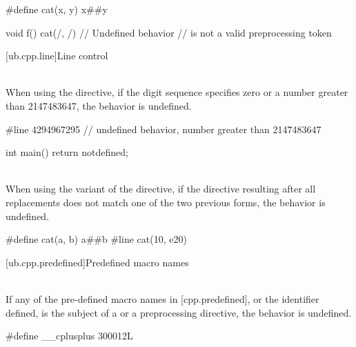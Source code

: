 \pnum
\begin{example}
\begin{codeblock}
#define cat(x, y) x##y

void f() {
  cat(/, /) // Undefined behavior // is not a valid preprocessing token
}
\end{codeblock}
\end{example}


[ub.cpp.line]{Line control}

\pnum
{} \\
When using the  directive, if the digit sequence
specifies zero or a number greater than 2147483647, the behavior is undefined.

\pnum
\begin{example}
\begin{codeblock}
#line 4294967295        // undefined behavior, number greater than 2147483647

int main() { return notdefined; }
\end{codeblock}
\end{example}

\pnum
{} \\
When using the  variant of the  directive, if the directive resulting after all replacements does not match
one of the two previous forms, the behavior is undefined.

\pnum
\begin{example}
\begin{codeblock}
#define cat(a, b) a##b
#line cat(10, e20)
\end{codeblock}
\end{example}

[ub.cpp.predefined]{Predefined macro names}

\pnum
{} \\
If any of the pre-defined macro names in [cpp.predefined], or the identifier defined, is the subject of a 
or a  preprocessing directive, the behavior is undefined.

\pnum
\begin{example}
\begin{codeblock}
#define __cplusplus 300012L
\end{codeblock}
\end{example}
